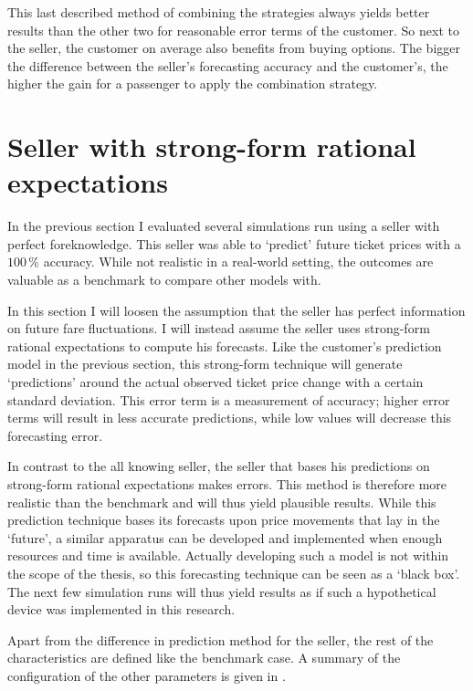 This last described method of combining the strategies always yields better results than the other two for reasonable error terms of the customer. So next to the seller, the customer on average also benefits from buying options. The bigger the difference between the seller's forecasting accuracy and the customer's, the higher the gain for a passenger to apply the combination strategy.



\section{Seller with strong-form rational expectations}
In the previous section I evaluated several simulations run using a seller with perfect foreknowledge. This seller was able to `predict' future ticket prices with a $100\,\%$ accuracy. While not realistic in a real-world setting, the outcomes are valuable as a benchmark to compare other models with.

In this section I will loosen the assumption that the seller has perfect information on future fare fluctuations. I will instead assume the seller uses strong-form rational expectations to compute his forecasts. Like the customer's prediction model in the previous section, this strong-form technique will generate `predictions' around the actual observed ticket price change with a certain standard deviation. This error term is a measurement of accuracy; higher error terms will result in less accurate predictions, while low values will decrease this forecasting error.

In contrast to the all knowing seller, the seller that bases his predictions on strong-form rational expectations makes errors. This method is therefore more realistic than the benchmark and will thus yield plausible results. While this prediction technique bases its forecasts upon price movements that lay in the `future', a similar apparatus can be developed and implemented when enough resources and time is available. Actually developing such a model is not within the scope of the thesis, so this forecasting technique can be seen as a `black box'. The next few simulation runs will thus yield results as if such a hypothetical device was implemented in this research.

Apart from the difference in prediction method for the seller, the rest of the characteristics are defined like the benchmark case. A summary of the configuration of the other parameters is given in .

